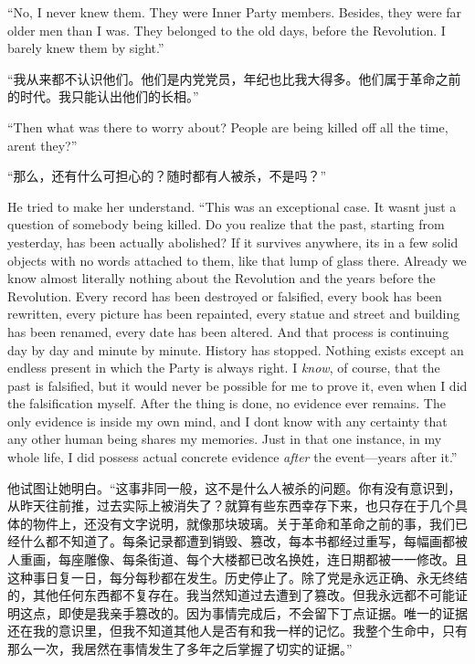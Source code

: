 \begin{paracol}{2}
``No, I never knew them. They were Inner Party members. Besides, they
were far older men than I was. They belonged to the old days, before the
Revolution. I barely knew them by sight.''

\switchcolumn

``我从来都不认识他们。他们是内党党员，年纪也比我大得多。他们属于革命之前的时代。我只能认出他们的长相。''

\switchcolumn*

``Then what was there to worry about? People are being killed off all the
time, aren\textquotesingle t they?''

\switchcolumn

``那么，还有什么可担心的？随时都有人被杀，不是吗？''

\switchcolumn*

He tried to make her understand. ``This was an exceptional case. It
wasn\textquotesingle t just a question of somebody being killed. Do you
realize that the past, starting from yesterday, has been actually
abolished? If it survives anywhere, it\textquotesingle s in a few solid
objects with no words attached to them, like that lump of glass there.
Already we know almost literally nothing about the Revolution and the
years before the Revolution. Every record has been destroyed or
falsified, every book has been rewritten, every picture has been
repainted, every statue and street and building has been renamed, every
date has been altered. And that process is continuing day by day and
minute by minute. History has stopped. Nothing exists except an endless
present in which the Party is always right. I \emph{know}, of course,
that the past is falsified, but it would never be possible for me to
prove it, even when I did the falsification myself. After the thing is
done, no evidence ever remains. The only evidence is inside my own mind,
and I don\textquotesingle t know with any certainty that any other human
being shares my memories. Just in that one instance, in my whole life, I
did possess actual concrete evidence \emph{after} the event---years
after it.''

\switchcolumn

他试图让她明白。``这事非同一般，这不是什么人被杀的问题。你有没有意识到，从昨天往前推，过去实际上被消失了？就算有些东西幸存下来，也只存在于几个具体的物件上，还没有文字说明，就像那块玻璃。关于革命和革命之前的事，我们已经什么都不知道了。每条记录都遭到销毁、篡改，每本书都经过重写，每幅画都被人重画，每座雕像、每条街道、每个大楼都已改名换姓，连日期都被一一修改。且这种事日复一日，每分每秒都在发生。历史停止了。除了党是永远正确、永无终结的，其他任何东西都不复存在。我当然知道过去遭到了篡改。但我永远都不可能证明这点，即使是我亲手篡改的。因为事情完成后，不会留下丁点证据。唯一的证据还在我的意识里，但我不知道其他人是否有和我一样的记忆。我整个生命中，只有那么一次，我居然在事情发生了多年之后掌握了切实的证据。''


\end{paracol}
